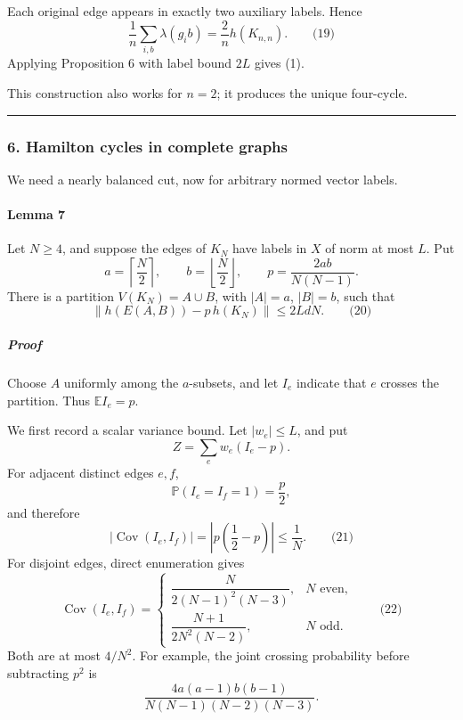 \documentclass[
  11pt,
  a4paper,
]{article}
\begin{document}
Each original edge appears in exactly two auxiliary labels. Hence \[
\frac1n\sum_{i,b}\lambda(g_i b)=\frac2n h(K_{n,n}).
\qquad\text{(19)}
\] Applying Proposition 6 with label bound \(2L\) gives (1).

This construction also works for \(n=2\); it produces the unique
four-cycle.

\begin{center}\rule{0.5\linewidth}{0.5pt}\end{center}

\subsubsection{6. Hamilton cycles in complete
graphs}\label{hamilton-cycles-in-complete-graphs}

We need a nearly balanced cut, now for arbitrary normed vector labels.

\paragraph{Lemma 7}\label{lemma-7}

Let \(N\ge4\), and suppose the edges of \(K_N\) have labels in \(X\) of
norm at most \(L\). Put \[
a=\left\lceil\frac N2\right\rceil,\qquad
b=\left\lfloor\frac N2\right\rfloor,\qquad
p=\frac{2ab}{N(N-1)}.
\] There is a partition \(V(K_N)=A\cup B\), with \(|A|=a\), \(|B|=b\),
such that \[
\left\|h(E(A,B))-p\,h(K_N)\right\|\le 2LdN.
\qquad\text{(20)}
\]

\subparagraph{Proof}\label{proof-4}

Choose \(A\) uniformly among the \(a\)-subsets, and let \(I_e\) indicate
that \(e\) crosses the partition. Thus \(\mathbb E I_e=p\).

We first record a scalar variance bound. Let \(|w_e|\le L\), and put \[
Z=\sum_e w_e(I_e-p).
\] For adjacent distinct edges \(e,f\), \[
\mathbb P(I_e=I_f=1)=\frac p2,
\] and therefore \[
\left|\operatorname{Cov}(I_e,I_f)\right|
=\left|p\left(\frac12-p\right)\right|
\le \frac1N.
\qquad\text{(21)}
\] For disjoint edges, direct enumeration gives \[
\operatorname{Cov}(I_e,I_f)=
\begin{cases}
\dfrac{N}{2(N-1)^2(N-3)},&N\text{ even},\\[6pt]
\dfrac{N+1}{2N^2(N-2)},&N\text{ odd}.
\end{cases}
\qquad\text{(22)}
\] Both are at most \(4/N^2\). For example, the joint crossing
probability before subtracting \(p^2\) is \[
\frac{4a(a-1)b(b-1)}
{N(N-1)(N-2)(N-3)}.
\]
\end{document}
